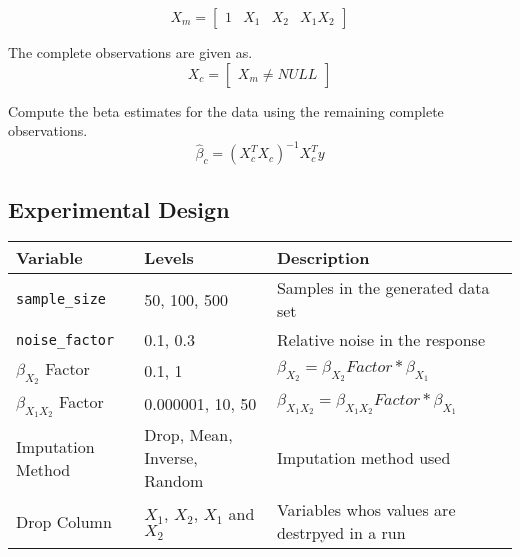 \documentclass[../paper.tex]{subfiles}
\begin{document}
\begin{equation}
  X_{m} = \begin{bmatrix}
  1 & X_{1} & X_{2} & X_{1}X_{2}
\end{bmatrix}
\end{equation}

The complete observations are given as.
\begin{equation}
  X_{c} =
  \begin{bmatrix}
    X_{m} \neq NULL
  \end{bmatrix}
\end{equation}

Compute the beta estimates for the data using the remaining complete observations.
\begin{equation}
  \hat{\beta}_{c} = (X_{c}^{T}X_{c})^{-1} X_{c}^{T} y
\end{equation}




\subsection{Experimental Design}

\begin{center}
    \begin{tabular}{ | l | p{1.7in} | p{3in} | }
      \hline

      \rule{0pt}{14pt} Variable & Levels & Description \\ \hline
      \rule{0pt}{14pt} \texttt{sample_size} & 50, 100, 500 &  Samples in the generated data set \\ \hline
      \rule{0pt}{14pt} \texttt{noise_factor} & 0.1, 0.3 &  Relative noise in the response \\ \hline
      \rule{0pt}{14pt} $\beta_{X_{2}}$ Factor & 0.1, 1 &  $\beta_{X_{2}} = \beta_{X_{2}} Factor * \beta_{X_{1}}$ \\ \hline
      \rule{0pt}{14pt} $\beta_{X_{1}X_{2}}$ Factor & 0.000001, 10, 50 &  $\beta_{X_{1}X_{2}} = \beta_{X_{1}X_{2}} Factor * \beta_{X_{1}}$ \\ \hline
      \rule{0pt}{14pt} Imputation Method & Drop, Mean, Inverse, Random & Imputation method used \\ \hline
      \rule{0pt}{14pt} Drop Column & $X_{1}$, $X_{2}$, $X_{1}$ and $X_{2}$ & Variables whos values are destrpyed in a run \\ \hline
    \end{tabular}
\end{center}

\end{document}
